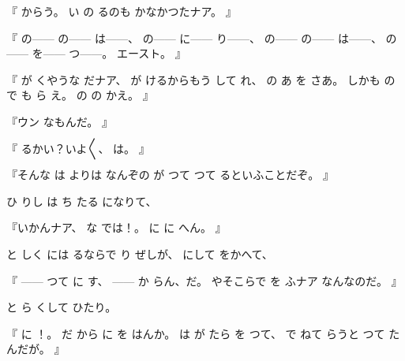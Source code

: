 『
からう。
い
の
るのも
かなかつたナア。
』

『
の------
の------
は------、
の------
に------
り------、
の------
の------
は------、
の------
を------
つ------。
エースト。
』

『
が
くやうな
だナア、
が
けるからもう
して
れ、
の
あ
を
さあ。
しかも
の
で
も
ら
え。
の
の
かえ。
』

『ウン
なもんだ。
』

『
るかい？いよ〳〵、
は。
』

『そんな
は
よりは
なんぞの
が
つて
つて
るといふことだぞ。
』

ひ
りし
は
ち
たる
になりて、

『いかんナア、
な
では！。
に
に
へん。
』

と
しく
には
るならで
り
ぜしが、
にして
をかへて、

『
------
つて
に
す、
------
か
らん、だ。
やそこらで
を
ふナア
なんなのだ。
』

と
ら
くして
ひたり。

『
に
！。
だ
から
に
を
はんか。
は
が
たら
を
つて、
で
ねて
らうと
つて
たんだが。
』

